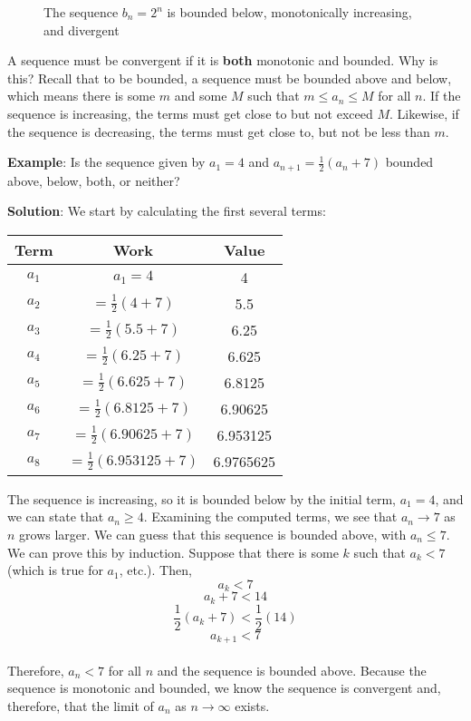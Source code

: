 \begin{figure}
    \centering
    \caption{The sequence $b_n = 2^n$ is bounded below, monotonically 
    increasing, and divergent}
    \label{fig:divexp}
\end{figure}

A sequence must be convergent if it is \textbf{both} monotonic and bounded. 
Why is this? Recall that to be bounded, a sequence must be bounded above and 
below, which means there is some $m$ and some $M$ such that $m \leq a_n \leq M$ 
for all $n$. If the sequence is increasing, the terms must get close to but not 
exceed $M$. Likewise, if the sequence is decreasing, the terms must get close 
to, but not be less than $m$.

\textbf{Example}: Is the sequence given by $a_1 = 4$ and $a_{n+1} = \frac{1}{2} 
(a_n + 7)$ bounded above, below, both, or neither?

\textbf{Solution}: We start by calculating the first several terms:
\begin{center}
	\begin{tabular}{|c|c|c|}\hline
	Term & Work & Value\\
	\hline
	$a_1$ & $a_1 = 4$ & 4\\
	\hline
	$a_2$ & $=\frac{1}{2}(4 + 7)$ & 5.5\\
	\hline
	$a_3$ & $=\frac{1}{2}(5.5+7)$ & 6.25\\
	\hline
	$a_4$ & $=\frac{1}{2}(6.25+7)$ & 6.625\\
	\hline
	$a_5$ & $=\frac{1}{2}(6.625+7)$ & 6.8125\\
	\hline
	$a_6$ & $=\frac{1}{2}(6.8125+7)$ & 6.90625\\
	\hline
	$a_7$ & $=\frac{1}{2}(6.90625+7)$ & 6.953125\\
	\hline
	$a_8$ & $=\frac{1}{2}(6.953125+7)$ & 6.9765625\\
	\hline	
	\end{tabular}
\end{center}

The sequence is increasing, so it is bounded below by the initial term, $a_1 = 
4$, and we can state that $a_n \geq 4$. Examining the computed terms, we see 
that $a_n \to 7$ as $n$ grows larger. We can guess that this sequence is 
bounded above, with $a_n \leq 7$. We can prove this by induction. Suppose that 
there is some $k$ such that $a_k < 7$ (which is true for $a_1$, etc.). Then,
$$a_k < 7$$
$$a_k + 7 < 14$$
$$\frac{1}{2}(a_k + 7) < \frac{1}{2}(14)$$
$$a_{k + 1} < 7$$\\
Therefore, $a_n < 7$ for all $n$ and the sequence is bounded above. Because 
the sequence is monotonic and bounded, we know the sequence is convergent and, 
therefore, that the limit of $a_n$ as $n \to \infty$ exists. 

